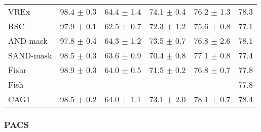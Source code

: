 \documentclass{article}
\begin{document}
\begin{center}
{\begin{tabular}{lccccc}
VREx                 & 98.4 $\pm$ 0.3       & 64.4 $\pm$ 1.4       & 74.1 $\pm$ 0.4       & 76.2 $\pm$ 1.3       & 78.3                 \\
RSC                  & 97.9 $\pm$ 0.1       & 62.5 $\pm$ 0.7       & 72.3 $\pm$ 1.2       & 75.6 $\pm$ 0.8       & 77.1                 \\
AND-mask             & 97.8 $\pm$ 0.4       & 64.3 $\pm$ 1.2       & 73.5 $\pm$ 0.7       & 76.8 $\pm$ 2.6       & 78.1                 \\
SAND-mask            & 98.5 $\pm$ 0.3       & 63.6 $\pm$ 0.9       & 70.4 $\pm$ 0.8       & 77.1 $\pm$ 0.8       & 77.4                 \\
Fishr                & 98.9 $\pm$ 0.3       & 64.0 $\pm$ 0.5       & 71.5 $\pm$ 0.2       & 76.8 $\pm$ 0.7       & 77.8                 \\
Fish                 &                      &                      &                      &                      & 77.8                 \\
\midrule
CAG1                 & 98.5 $\pm$ 0.2       & 64.0 $\pm$ 1.1       & 73.1 $\pm$ 2.0       & 78.1 $\pm$ 0.7       & 78.4                 \\
\bottomrule
\end{tabular}}
\end{center}

\subsubsection{PACS}
\end{document}
